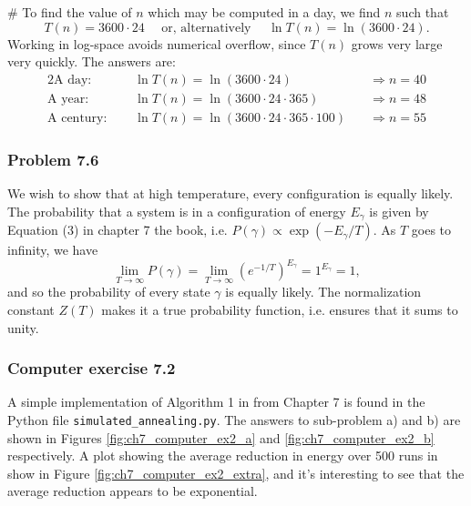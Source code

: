 \documentclass[12pt, a4paper]{article}
\begin{document}
{\begin{easylist}[enumerate]
# To find the value of $n$ which may be computed in a day, we find $n$ such that
\begin{equation*}
	T(n) = 3600 \cdot 24 \quad \text{   or, alternatively   } \quad \ln T(n) = \ln (3600 \cdot 24).
\end{equation*}
Working in log-space avoids numerical overflow, since $T(n)$ grows very large very quickly.
The answers are:
\begin{alignat*}{2}
	\text{A day: } &  \quad \ln T(n) = \ln (3600 \cdot 24) \quad&\Rightarrow n = 40 \\
	\text{A year: } &  \quad \ln T(n) = \ln (3600 \cdot 24 \cdot 365) \quad&\Rightarrow n = 48 \\
	\text{A century: } &  \quad \ln T(n) = \ln (3600 \cdot 24  \cdot 365 \cdot 100) \quad &\Rightarrow n = 55
\end{alignat*}

\end{easylist}


\subsubsection*{Problem 7.6}
We wish to show that at high temperature, every configuration is equally likely.
The probability that a system is in a configuration of energy $E_\gamma$ is given by Equation (3) in chapter 7 the book, i.e. $P(\gamma) \propto \exp(-E_\gamma / T)$.
As $T$ goes to infinity, we have
\begin{equation*}
	\lim_{T \to \infty} P(\gamma) = 
	\lim_{T \to \infty} \left( e^{-1 / T} \right)^{E_\gamma} = 1^{E_\gamma} = 1,
\end{equation*}
and so the probability of every state $\gamma$ is equally likely. The normalization constant $Z(T)$ makes it a true probability function, i.e. ensures that it sums to unity.




\subsubsection*{Computer exercise 7.2}
A simple implementation of Algorithm 1 in from Chapter 7 is found in the Python file \verb|simulated_annealing.py|.
The answers to sub-problem a) and b) are shown in Figures \ref{fig:ch7_computer_ex2_a} and \ref{fig:ch7_computer_ex2_b} respectively.
A plot showing the average reduction in energy over 500 runs in show in Figure  \ref{fig:ch7_computer_ex2_extra}, and it's interesting to see that the average reduction appears to be exponential.


}
\end{document}

